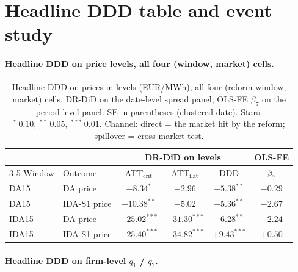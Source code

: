 \documentclass[11pt,a4paper]{article}
\begin{document}
\section{Headline DDD table and event study}\label{sec:ident:headline}

\paragraph{Headline DDD on price levels, all four (window, market) cells.}

\begin{table}[H]
\centering\footnotesize
\setlength{\tabcolsep}{4pt}
\caption{Headline DDD on prices in levels (EUR/MWh), all four (reform window, market) cells. DR-DiD on the date-level spread panel; OLS-FE $\beta_7$ on the period-level panel. SE in parentheses (clustered date). Stars: $^{*}~0.10,~^{**}~0.05,~^{***}~0.01$. Channel: direct = the market hit by the reform; spillover = cross-market test.}
\label{tab:reform_ddd_summary}
\begin{tabular}{llcccc}
\toprule
& & \multicolumn{3}{c}{DR-DiD on levels} & OLS-FE \\
\cmidrule(lr){3-5}
Window & Outcome & ATT$_{\text{crit}}$ & ATT$_{\text{flat}}$ & DDD & $\beta_7$ \\
\midrule
DA15  & DA price        & $-8.34^{*}$        & $-2.96$        & $-5.38^{**}$ & $-0.29$ \\
DA15  & IDA-S1 price    & $-10.38^{**}$      & $-5.02$        & $-5.36^{**}$ & $-2.67$ \\
IDA15 & DA price        & $-25.02^{***}$     & $-31.30^{***}$ & $+6.28^{**}$ & $-2.24$ \\
IDA15 & IDA-S1 price    & $-25.40^{***}$     & $-34.82^{***}$ & $+9.43^{***}$ & $+0.50$ \\
\bottomrule
\end{tabular}
\end{table}

\paragraph{Headline DDD on firm-level $q_1$ / $q_2$.}
\end{document}
